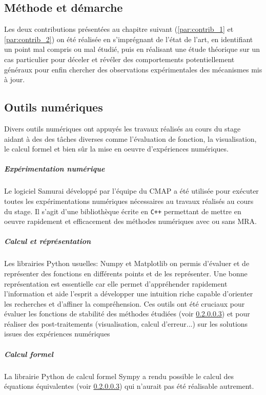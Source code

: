 \subsection{Méthode et démarche}
    Les deux contributions présentées au chapitre suivant (\ref{par:contrib_1} et \ref{par:contrib_2}) on été réalisée 
    en s'imprégnant de l'état de l'art, en identifiant un point mal compris ou mal étudié, puis
    en réalisant une étude théorique sur un cas particulier pour déceler et révéler des comportements potentiellement généraux
    pour enfin chercher des observations expérimentales des mécanismes mis à jour.
\subsection{Outils numériques}
    Divers outils numériques ont appuyés les travaux réalisés au cours du stage aidant à des des tâches diverses comme 
    l'évaluation de fonction, la visualisation, le calcul formel et bien sûr la mise en oeuvre d'expériences numériques.
    \subparagraph{Expérimentation numérique}
        Le logiciel Samurai développé par l'équipe du CMAP a été utilisée pour exécuter toutes les expérimentations numériques nécessaires 
        au travaux réalisés au cours du stage. Il s'agit d'une bibliothèque écrite en \texttt{C++} permettant de mettre en oeuvre 
        rapidement et efficacement des méthodes numériques avec ou sans MRA.
    \subparagraph{Calcul et réprésentation}
        Les librairies Python usuelles: Numpy et Matplotlib on permis d'évaluer et de représenter des fonctions en différents points et de 
        les représenter. Une bonne représentation est essentielle car elle permet d'appréhender rapidement l'information et aide l'esprit 
        a développer une intuition riche capable d'orienter les recherches et d'affiner la compréhension. 
        Ces outils ont été cruciaux pour évaluer les fonctions de stabilité des méthodes étudiées (voir \ref{}) et pour réaliser 
        des post-traitements (visualisation, calcul d'erreur...) sur les solutions issues des expériences numériques  
    \subparagraph{Calcul formel}
        La librairie Python de calcul formel Sympy a rendu possible le calcul des équations équivalentes (voir \ref{}) qui n'aurait pas 
        été réalisable autrement. 